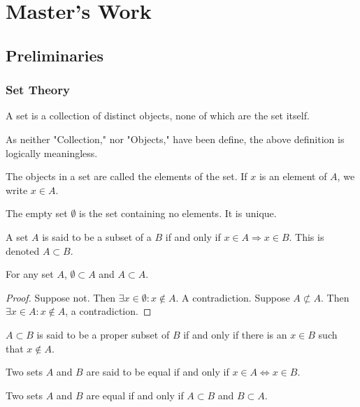 \documentclass[crop=false,class=book]{standalone}
\begin{document}
\chapter{Master's Work}
\section{Preliminaries}
\subsection{Set Theory}
\begin{definition}
A set is a collection of distinct objects, none of which are the set itself.
\end{definition}
\begin{remark}
As neither "Collection," nor "Objects," have been define, the above definition is logically meaningless.
\end{remark}
\begin{definition}
The objects in a set are called the elements of the set. If $x$ is an element of $A$, we write $x\in A$.
\end{definition}
\begin{definition}
The empty set $\emptyset$ is the set containing no elements. It is unique.
\end{definition}
\begin{definition}
A set $A$ is said to be a subset of a $B$ if and only if $x\in A\Rightarrow x\in B$. This is denoted $A\subset B$.
\end{definition}
\begin{corollary}
For any set $A$, $\emptyset \subset A$ and $A\subset A$.
\end{corollary}
\begin{proof}
Suppose not. Then $\exists x\in \emptyset: x\notin A$. A contradiction. Suppose $A\not\subset A$. Then $\exists x\in A:x\notin A$, a contradiction.
\end{proof}
\begin{definition}
$A\subset B$ is said to be a proper subset of $B$ if and only if there is an $x\in B$ such that $x\notin A$.
\end{definition}
\begin{definition}
Two sets $A$ and $B$ are said to be equal if and only if $x\in A \Leftrightarrow x\in B$.
\end{definition}
\begin{theorem}
Two sets $A$ and $B$ are equal if and only if $A\subset B$ and $B\subset A$.
\end{theorem}
\end{document}
